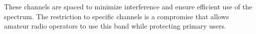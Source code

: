 These channels are spaced to minimize interference and ensure efficient use of the spectrum. The restriction to specific channels is a compromise that allows amateur radio operators to use this band while protecting primary users.

